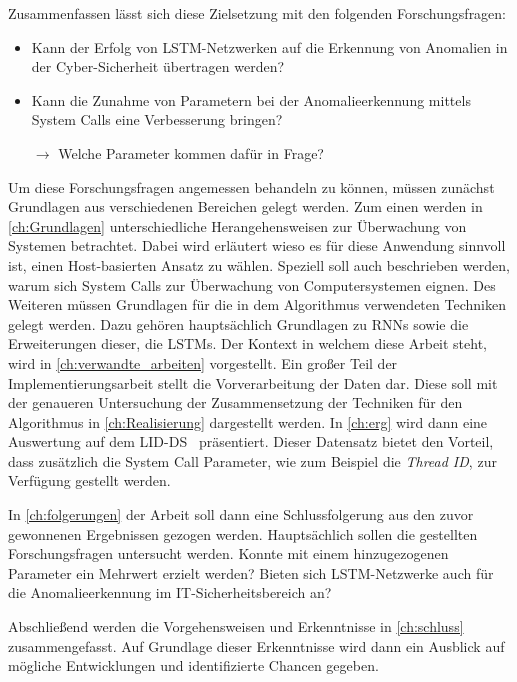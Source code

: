 Zusammenfassen lässt sich diese Zielsetzung mit den folgenden Forschungsfragen:
\begin{itemize}
    \item Kann der Erfolg von \ac{LSTM}-Netzwerken auf die Erkennung von Anomalien in der Cyber-Sicherheit übertragen werden?
    \item Kann die Zunahme von Parametern bei der Anomalieerkennung mittels System Calls eine Verbesserung bringen?

        $\rightarrow$ Welche Parameter kommen dafür in Frage?
\end{itemize}

Um diese Forschungsfragen angemessen behandeln zu können, müssen zunächst Grundlagen aus verschiedenen Bereichen gelegt werden.
Zum einen werden in \autoref{ch:Grundlagen} unterschiedliche Herangehensweisen zur Überwachung von Systemen betrachtet.
Dabei wird erläutert wieso es für diese Anwendung sinnvoll ist, einen Host-basierten Ansatz zu wählen.
Speziell soll auch beschrieben werden, warum sich System Calls zur Überwachung von Computersystemen eignen.
Des Weiteren müssen Grundlagen für die in dem Algorithmus verwendeten Techniken gelegt werden.
Dazu gehören hauptsächlich Grundlagen zu \acfp{RNN} sowie die Erweiterungen dieser, die \acp{LSTM}.
Der Kontext in welchem diese Arbeit steht, wird in \autoref{ch:verwandte_arbeiten} vorgestellt.
Ein großer Teil der Implementierungsarbeit stellt die Vorverarbeitung der Daten dar.
Diese soll mit der genaueren Untersuchung der Zusammensetzung der Techniken für den Algorithmus in \autoref{ch:Realisierung} dargestellt werden.
In \autoref{ch:erg} wird dann eine Auswertung auf dem \acf{LID-DS}~\cite{LID-DS} präsentiert.
Dieser Datensatz bietet den Vorteil, dass zusätzlich die System Call Parameter, wie zum Beispiel die \textit{Thread ID}, zur Verfügung gestellt werden.

In \autoref{ch:folgerungen} der Arbeit soll dann eine Schlussfolgerung aus den zuvor gewonnenen Ergebnissen gezogen werden. 
Hauptsächlich sollen die gestellten Forschungsfragen untersucht werden.
Konnte mit einem hinzugezogenen Parameter ein Mehrwert erzielt werden?
Bieten sich LSTM-Netzwerke auch für die Anomalieerkennung im IT-Sicherheitsbereich an?

Abschließend werden die Vorgehensweisen und Erkenntnisse in \autoref{ch:schluss} zusammengefasst.
Auf Grundlage dieser Erkenntnisse wird dann ein Ausblick auf mögliche Entwicklungen und identifizierte Chancen gegeben. 

